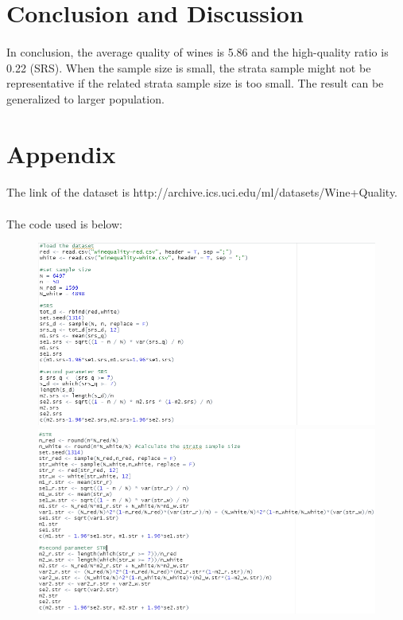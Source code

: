 \documentclass{article}
\begin{document}
\section{Conclusion and Discussion}
\paragraph{}
In conclusion, the average quality of wines is 5.86 and the high-quality ratio is 0.22 (SRS). When the sample size is small, the strata sample might not be representative if the related strata sample size is too small. The result can be generalized to larger population.
\section{Appendix}
\paragraph{}
The link of the dataset is http://archive.ics.uci.edu/ml/datasets/Wine+Quality.
\paragraph{}
The code used is below:
\begin{figure}[h]
    \includegraphics[width=\textwidth]{2.png}
    \includegraphics[width=\textwidth]{3.png}
\end{figure}
\end{document}
